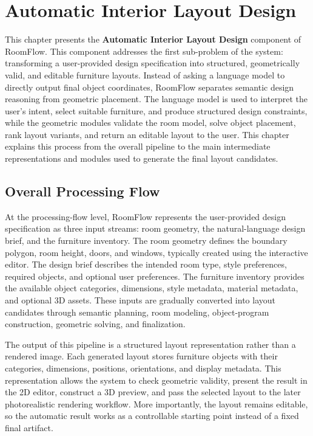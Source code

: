 \chapter{Automatic Interior Layout Design}

This chapter presents the \textbf{Automatic Interior Layout Design} component of RoomFlow. This component addresses the first sub-problem of the system: transforming a user-provided design specification into structured, geometrically valid, and editable furniture layouts. Instead of asking a language model to directly output final object coordinates, RoomFlow separates semantic design reasoning from geometric placement. The language model is used to interpret the user's intent, select suitable furniture, and produce structured design constraints, while the geometric modules validate the room model, solve object placement, rank layout variants, and return an editable layout to the user. This chapter explains this process from the overall pipeline to the main intermediate representations and modules used to generate the final layout candidates.

\section{Overall Processing Flow}\label{sec:problem1-processing-flow}

At the processing-flow level, RoomFlow represents the user-provided design specification as three input streams: room geometry, the natural-language design brief, and the furniture inventory. The room geometry defines the boundary polygon, room height, doors, and windows, typically created using the interactive editor. The design brief describes the intended room type, style preferences, required objects, and optional user preferences. The furniture inventory provides the available object categories, dimensions, style metadata, material metadata, and optional 3D assets. These inputs are gradually converted into layout candidates through semantic planning, room modeling, object-program construction, geometric solving, and finalization.

The output of this pipeline is a structured layout representation rather than a rendered image. Each generated layout stores furniture objects with their categories, dimensions, positions, orientations, and display metadata. This representation allows the system to check geometric validity, present the result in the 2D editor, construct a 3D preview, and pass the selected layout to the later photorealistic rendering workflow. More importantly, the layout remains editable, so the automatic result works as a controllable starting point instead of a fixed final artifact.

